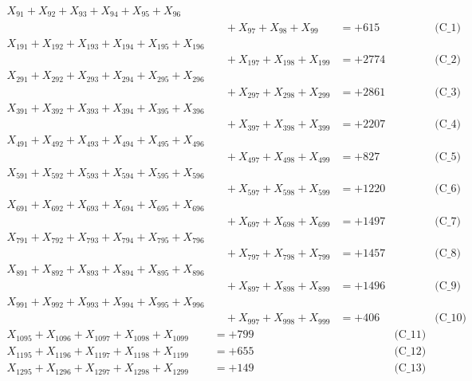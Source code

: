 \documentclass[a4paper,10pt]{article}
\begin{document}
\allowdisplaybreaks
{\small
\begin{align}
X_{91} + X_{92} + X_{93} + X_{94} + X_{95} + X_{96} \\[0.1ex]
&\quad  + X_{97} + X_{98} + X_{99} &= +615 && \text{(C\_1)} \\
X_{191} + X_{192} + X_{193} + X_{194} + X_{195} + X_{196} \\[0.1ex]
&\quad  + X_{197} + X_{198} + X_{199} &= +2774 && \text{(C\_2)} \\
X_{291} + X_{292} + X_{293} + X_{294} + X_{295} + X_{296} \\[0.1ex]
&\quad  + X_{297} + X_{298} + X_{299} &= +2861 && \text{(C\_3)} \\
X_{391} + X_{392} + X_{393} + X_{394} + X_{395} + X_{396} \\[0.1ex]
&\quad  + X_{397} + X_{398} + X_{399} &= +2207 && \text{(C\_4)} \\
X_{491} + X_{492} + X_{493} + X_{494} + X_{495} + X_{496} \\[0.1ex]
&\quad  + X_{497} + X_{498} + X_{499} &= +827 && \text{(C\_5)} \\
\allowbreak
X_{591} + X_{592} + X_{593} + X_{594} + X_{595} + X_{596} \\[0.1ex]
&\quad  + X_{597} + X_{598} + X_{599} &= +1220 && \text{(C\_6)} \\
X_{691} + X_{692} + X_{693} + X_{694} + X_{695} + X_{696} \\[0.1ex]
&\quad  + X_{697} + X_{698} + X_{699} &= +1497 && \text{(C\_7)} \\
X_{791} + X_{792} + X_{793} + X_{794} + X_{795} + X_{796} \\[0.1ex]
&\quad  + X_{797} + X_{798} + X_{799} &= +1457 && \text{(C\_8)} \\
X_{891} + X_{892} + X_{893} + X_{894} + X_{895} + X_{896} \\[0.1ex]
&\quad  + X_{897} + X_{898} + X_{899} &= +1496 && \text{(C\_9)} \\
X_{991} + X_{992} + X_{993} + X_{994} + X_{995} + X_{996} \\[0.1ex]
&\quad  + X_{997} + X_{998} + X_{999} &= +406 && \text{(C\_10)} \\
\allowbreak
X_{1095} + X_{1096} + X_{1097} + X_{1098} + X_{1099} &= +799 && \text{(C\_11)} \\
X_{1195} + X_{1196} + X_{1197} + X_{1198} + X_{1199} &= +655 && \text{(C\_12)} \\
X_{1295} + X_{1296} + X_{1297} + X_{1298} + X_{1299} &= +149 && \text{(C\_13)} \\

\end{align}}
\end{document}
